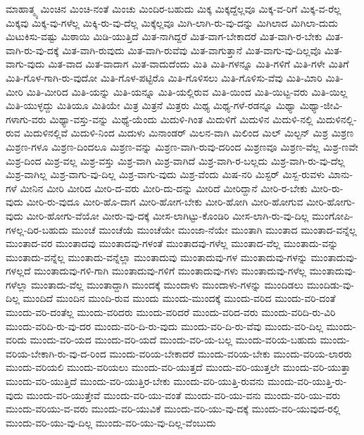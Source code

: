 {ಮಾಹಾತ್ಮ್ಯ
ಮಿಂಚಿನ
ಮಿಂಚಿ-ನಂತೆ
ಮಿಂಚು
ಮಿಂದಿರ-ಬಹುದು
ಮಿಕ್ಕ
ಮಿಕ್ಕದ್ದೆಲ್ಲವೂ
ಮಿಕ್ಕ-ವ-ರಿಗೆ
ಮಿಕ್ಕ-ವ-ರೆಲ್ಲ
ಮಿಕ್ಕವು
ಮಿಕ್ಕ-ವು-ಗಳೆಲ್ಲ
ಮಿಕ್ಕಿ-ರು-ವು-ದೆಲ್ಲ
ಮಿಕ್ಕೆಲ್ಲವೂ
ಮಿಗಿ-ಲಾಗಿ-ರು-ವು-ದನ್ನು
ಮಿಗಿಲಾದ
ಮಿಗಿಲಾ-ದುದು
ಮಿಟುಕಿಸು-ವಷ್ಟು
ಮಿಠಾಯಿ
ಮಿಡಿ-ಯುತ್ತಿದೆ
ಮಿತ-ನಾಗಿದ್ದರೆ
ಮಿತ-ವಾಗ-ಬೇಕಾದರೆ
ಮಿತ-ವಾಗಿ-ರ-ಬೇಕು
ಮಿತ-ವಾಗಿ-ರು-ವು-ದಕ್ಕೆ
ಮಿತ-ವಾಗಿ-ರುವುದು
ಮಿತ-ವಾಗಿ-ರುವೆವು
ಮಿತ-ವಾಗುತ್ತಾನೆ
ಮಿತ-ವಾಗು-ವು-ದಿಲ್ಲವೊ
ಮಿತ-ವಾಗು-ವುದು
ಮಿತ-ವಾದ
ಮಿತ-ವಾದಾಗ
ಮಿತ-ವಾದುದೆಂದು
ಮಿತಿ
ಮಿತಿ-ಗಳನ್ನೂ
ಮಿತಿ-ಗಳಿಗೆ
ಮಿತಿ-ಗಳೇ
ಮಿತಿಗೆ
ಮಿತಿ-ಗೊಳ-ಗಾಗಿ-ರು-ವುದೋ
ಮಿತಿ-ಗೊಳ-ಪಟ್ಟಿರೊ
ಮಿತಿ-ಗೊಳಿಸಲು
ಮಿತಿ-ಗೊಳಿಸು-ವೆವು
ಮಿತಿ-ಮಿಾರಿ
ಮಿತಿ-ಮೀರಿ
ಮಿತಿ-ಮೀರಿದ
ಮಿತಿ-ಯನ್ನು
ಮಿತಿ-ಯನ್ನೂ
ಮಿತಿ-ಯಲ್ಲಿರುವ
ಮಿತಿ-ಯಿಂದ
ಮಿತಿ-ಯಿಟ್ಟ-ವರು
ಮಿತಿ-ಯಿಲ್ಲ
ಮಿತಿ-ಯುಳ್ಳದ್ದು
ಮಿತಿಯೂ
ಮಿತಿಯೇ
ಮಿತ್ರ
ಮಿತ್ರನೆ
ಮಿತ್ರರು
ಮಿಥ್ಯ
ಮಿಥ್ಯ-ಗಳೆ-ರಡನ್ನೂ
ಮಿಥ್ಯಾ
ಮಿಥ್ಯಾ-ಜೀವಿ-ಗಳಾಗು-ವರು
ಮಿಥ್ಯಾ-ವಸ್ತು-ವನ್ನು
ಮಿಥ್ಯೆ-ಯೆಂದು
ಮಿದುಳಿ-ಗಿಂತ
ಮಿದುಳಿಗೆ
ಮಿದುಳಿನ
ಮಿದುಳಿ-ನಲ್ಲಿ
ಮಿದುಳಿನಲ್ಲಿ-ರುವ
ಮಿದುಳಿನಲ್ಲಿವೆ
ಮಿದುಳಿ-ನಿಂದ
ಮಿದುಳು
ಮಿನಾಂಡರ್
ಮಿಲನ-ವಾಗಿ
ಮಿಲಿಂದ
ಮಿಲ್
ಮಿಲ್ಟನ್
ಮಿಶ್ರ
ಮಿಶ್ರಣ
ಮಿಶ್ರಣ-ಗಳೂ
ಮಿಶ್ರಣ-ದಿಂದಲೂ
ಮಿಶ್ರಣ-ವನ್ನು
ಮಿಶ್ರಣ-ವಾಗಿ-ರುವು-ದರಿಂದ
ಮಿಶ್ರಣವೂ
ಮಿಶ್ರಣ-ವೆಲ್ಲ
ಮಿಶ್ರ-ಣವೇ
ಮಿಶ್ರ-ದಿಂದ
ಮಿಶ್ರ-ವಲ್ಲ
ಮಿಶ್ರ-ವಸ್ತು
ಮಿಶ್ರ-ವಾಗಿ
ಮಿಶ್ರ-ವಾಗಿದೆ
ಮಿಶ್ರ-ವಾಗಿ-ರ-ಬಲ್ಲದು
ಮಿಶ್ರ-ವಾಗಿ-ರು-ವು-ದೆಲ್ಲ
ಮಿಶ್ರ-ವಾಗಿಲ್ಲ
ಮಿಶ್ರ-ವಾಗು-ವು-ದಿಲ್ಲ
ಮಿಶ್ರ-ವಾಗು-ವುದು
ಮಿಶ್ರ-ವೆಂದು
ಮಿಷ-ನರಿ
ಮಿಸ್ಟರ್
ಮಿಸ್ಬ-ರುವಳು
ಮಿಾನು-ಗಳೆ
ಮೀನಿನ
ಮೀರಿ
ಮೀರಿದ
ಮೀರಿ-ದ-ವರು
ಮೀರಿ-ದು-ದನ್ನು
ಮೀರಿದೆ
ಮೀರಿದ್ದಾನೆ
ಮೀರಿ-ರ-ಬೇಕು
ಮೀರಿ-ರು-ವುದು
ಮೀರಿ-ರು-ವುದೂ
ಮೀರಿ-ಹೊ-ದಾಗ
ಮೀರಿ-ಹೋಗ-ಬೇಕು
ಮೀರಿ-ಹೋಗಿ
ಮೀರಿ-ಹೋಗುವ
ಮೀರಿ-ಹೋಗು-ವುದು
ಮೀರಿ-ಹೋಗು-ವೆಯೋ
ಮೀರು-ವು-ದಕ್ಕೆ
ಮೀಸ-ಲಾಗಿಟ್ಟು-ಕೊಂಡಿರಿ
ಮೀಸ-ಲಾಗಿ-ರು-ವು-ದಿಲ್ಲ
ಮುಂಗೋಪಿ-ಗಳಲ್ಲ-ದಿರ-ಬಹುದು
ಮುಂಚೆ
ಮುಂಚೆಯೆ
ಮುಂಚೆಯೇ
ಮುಂಜಾ-ನೆಯೇ
ಮುಂತಾಗಿ
ಮುಂತಾದ
ಮುಂತಾದ-ವನ್ನೆಲ್ಲ
ಮುಂತಾದ-ವರ
ಮುಂತಾದವು
ಮುಂತಾದವು-ಗಳಂತೆ
ಮುಂತಾದವು-ಗಳೆಲ್ಲ
ಮುಂತಾದ-ವೆಲ್ಲ
ಮುಂತಾದು-ವನ್ನು
ಮುಂತಾದು-ವನ್ನೆಲ್ಲ
ಮುಂತಾದು-ವನ್ನೆಲ್ಲಾ
ಮುಂತಾದುವು
ಮುಂತಾದುವು-ಗಳ
ಮುಂತಾದುವು-ಗಳನ್ನು
ಮುಂತಾದುವು-ಗಳಲ್ಲದೆ
ಮುಂತಾದುವು-ಗಳಿ-ಗಾಗಿ
ಮುಂತಾದುವು-ಗಳಿಗೆ
ಮುಂತಾದುವು-ಗಳು
ಮುಂತಾದುವು-ಗಳೆಲ್ಲ
ಮುಂತಾದುವು-ಗಳೆಲ್ಲಾ
ಮುಂತಾದು-ವೆಲ್ಲ
ಮುಂತಾದ್ದಾಗಿ
ಮುಂದಕ್ಕೆ
ಮುಂದಾಳು
ಮುಂದಾಳು-ಗಳನ್ನು
ಮುಂದಿಡಲು
ಮುಂದಿಡು-ವು-ದಿಲ್ಲ
ಮುಂದಿದೆ
ಮುಂದಿನ
ಮುಂದಿ-ರುವ
ಮುಂದು
ಮುಂದು-ಮುಂದಕ್ಕೆ
ಮುಂದು-ವರಿದ
ಮುಂದು-ವರಿ-ದಂತೆ
ಮುಂದು-ವರಿ-ದಂತೆಲ್ಲ
ಮುಂದು-ವರಿದರು
ಮುಂದು-ವರಿದರೆ
ಮುಂದು-ವರಿದ-ವರು
ಮುಂದು-ವರಿದಿ-ರು-ವಿರಿ
ಮುಂದು-ವರಿದಿ-ರು-ವು-ದರ
ಮುಂದು-ವರಿ-ದಿ-ರು-ವುದು
ಮುಂದು-ವರಿ-ದಿ-ರು-ವೆವು
ಮುಂದು-ವರಿ-ದಿಲ್ಲ
ಮುಂದು-ವರಿದು
ಮುಂದು-ವರಿ-ಯದ
ಮುಂದು-ವರಿ-ಯದೆ
ಮುಂದು-ವರಿ-ಯ-ಬಲ್ಲ
ಮುಂದು-ವರಿಯ-ಬಹುದು
ಮುಂದು-ವರಿಯ-ಬೇಕಾಗಿ-ರು-ವು-ದ-ರಿಂದ
ಮುಂದು-ವರಿಯ-ಬೇಕಾದರೆ
ಮುಂದು-ವರಿಯ-ಬೇಕು
ಮುಂದು-ವರಿಯ-ಲಾರರು
ಮುಂದು-ವರಿಯಲಿ
ಮುಂದು-ವರಿಯಲು
ಮುಂದು-ವರಿ-ಯುತ್ತದೆ
ಮುಂದು-ವರಿ-ಯುತ್ತಲೇ
ಮುಂದು-ವರಿ-ಯುತ್ತಾ
ಮುಂದು-ವರಿ-ಯುತ್ತಿದೆ
ಮುಂದು-ವರಿ-ಯುತ್ತಿರ-ಬೇಕು
ಮುಂದು-ವರಿ-ಯುತ್ತಿ-ರುವನು
ಮುಂದು-ವರಿ-ಯುತ್ತಿ-ರು-ವುದು
ಮುಂದು-ವರಿ-ಯುತ್ತೇವೆ
ಮುಂದು-ವರಿ-ಯು-ವಂತೆ
ಮುಂದು-ವರಿ-ಯು-ವನು
ಮುಂದು-ವರಿ-ಯು-ವರು
ಮುಂದು-ವರಿಯು-ವ-ವರು
ಮುಂದು-ವರಿ-ಯುವಿಕೆ
ಮುಂದು-ವರಿ-ಯು-ವು-ದಕ್ಕೆ
ಮುಂದು-ವರಿ-ಯುವುದ-ರಲ್ಲಿ
ಮುಂದು-ವರಿ-ಯು-ವು-ದಿಲ್ಲ
ಮುಂದು-ವರಿ-ಯು-ವು-ದಿಲ್ಲ-ವೆಂಬುದು
}
